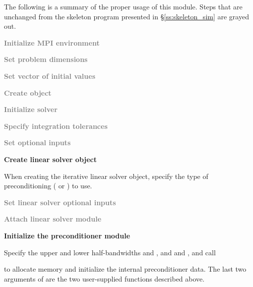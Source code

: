The following is a summary of the proper usage of this module. Steps that are
unchanged from the skeleton program presented in \S\ref{ss:skeleton_sim} are grayed out.
\begin{Steps}
\item 
  \textcolor{gray}{\bf Initialize MPI environment}

\item
  \textcolor{gray}{\bf Set problem dimensions}

\item
  \textcolor{gray}{\bf Set vector of initial values}
 
\item
  \textcolor{gray}{\bf Create {\cvode} object}

\item
  \textcolor{gray}{\bf Initialize {\cvode} solver}

\item
  \textcolor{gray}{\bf Specify integration tolerances}

\item
  \textcolor{gray}{\bf Set optional inputs}

\item
  {\bf Create linear solver object}

  When creating the iterative linear solver object, specify the type
  of preconditioning ( or ) to use.

\item
  \textcolor{gray}{\bf Set linear solver optional inputs}

\item \label{i:bbdpre_attach}
  \textcolor{gray}{\bf Attach linear solver module}

\item \label{i:bbdpre_init}
  {\bf Initialize the {\cvbbdpre} preconditioner module}

  Specify the upper and lower half-bandwidths  and , and
   and , and call 


   to allocate memory and initialize the internal preconditioner data.
   The last two arguments of  are the two user-supplied 
   functions described above.


\end{Steps}
